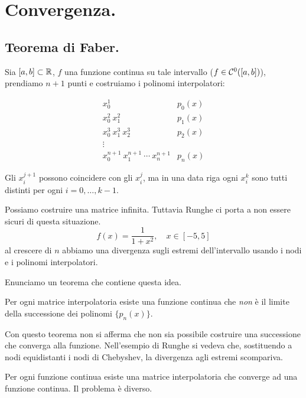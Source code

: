 
\chapter{Convergenza.}

\section{Teorema di Faber.}
Sia $[a,b] \subset \mathbb{R}$, $f$ una funzione continua su tale intervallo ($f \in
\mathcal{C}^0([a,b])$), prendiamo $n+1$ punti e costruiamo i polinomi interpolatori:

\[
\begin{array}{ll}
x_0^1 & p_0(x) \\
x_0^2 \ x_1^2 & p_1(x)\\
x_0^3 \ x_1^3 \ x_2^3 & p_2(x) \\
\vdots \\
x_0^{n+1} \ x_1^{n+1} \ \cdots \ x_n^{n+1} & p_n(x)
\end{array}
\]

Gli $x_i^{j+1}$ possono coincidere con gli $x_i^j$, ma in una data riga ogni
$x_i^k$ sono tutti distinti per ogni $i = 0, \ldots, k-1$.

\begin{flushleft}
Possiamo costruire una matrice infinita. Tuttavia Runghe ci porta a non essere
sicuri di questa situazione.
\[f(x) = \frac{1}{1+x^2}, \quad x \in [-5,5]\]
al crescere di $n$ abbiamo una divergenza sugli estremi dell'intervallo usando
i nodi e i polinomi interpolatori.
\end{flushleft}

Enunciamo un teorema che contiene questa idea.

\begin{teo}
Per ogni matrice interpolatoria esiste una funzione continua che \emph{non}
è il limite della successione dei polinomi $\{p_n(x)\}$.
\end{teo}
\begin{osse}
Con questo teorema non si afferma che non sia possibile costruire una
successione che converga alla funzione. Nell'esempio di Runghe si vedeva che,
sostituendo a nodi equidistanti i nodi di Chebyshev, la divergenza agli
estremi scompariva.

Per ogni funzione continua esiste una matrice interpolatoria che converge ad
una funzione continua. Il problema è diverso.
\end{osse}

